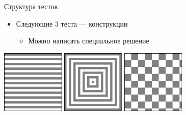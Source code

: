 \begin{frame}[t]{Структура тестов}
    \begin{itemize}
        \item Следующие 3 теста --- конструкции %
        \begin{itemize}
            \item Можно написать специальное решение
        \end{itemize}
    \end{itemize}
    \begin{center}
        \includegraphics[height=3cm]{cham06.png}
        \quad
        \includegraphics[height=3cm]{cham07.png}
        \quad
        \includegraphics[height=3cm]{cham08.png}
    \end{center}
\end{frame}
